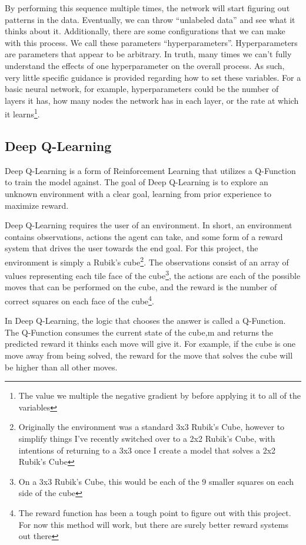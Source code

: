 \documentclass[12pt]{article}
\begin{document}
By performing this sequence multiple times, the network will start figuring out patterns in the data. Eventually, we can throw ``unlabeled data'' and see what it thinks about it. Additionally, there are some configurations that we can make with this process. We call these parameters ``hyperparameters''. Hyperparameters are parameters that appear to be arbitrary. In truth, many times we can't fully understand the effects of one hyperparameter on the overall process. As such, very little specific guidance is provided regarding how to set these variables. For a basic neural network, for example, hyperparameters could be the number of layers it has, how many nodes the network has in each layer, or the rate at which it learns\footnote{The value we multiple the negative gradient by before applying it to all of the variables}.

\subsection{Deep Q-Learning}


Deep Q-Learning is a form of Reinforcement Learning that utilizes a Q-Function to train the model against. The goal of Deep Q-Learning is to explore an unknown environment with a clear goal, learning from prior experience to maximize reward.

Deep Q-Learning requires the user of an environment. In short, an environment contains observations, actions the agent can take, and some form of a reward system that drives the user towards the end goal. For this project, the environment is simply a Rubik's cube\footnote{Originally the environment was a standard 3x3 Rubik's Cube, however to simplify things I've recently switched over to a 2x2 Rubik's Cube, with intentions of returning to a 3x3 once I create a model that solves a 2x2 Rubik's Cube}. The observations consist of an array of values representing each tile face of the cube\footnote{On a 3x3 Rubik's Cube, this would be each of the 9 smaller squares on each side of the cube}, the actions are each of the possible moves that can be performed on the cube, and the reward is the number of correct squares on each face of the cube\footnote{The reward function has been a tough point to figure out with this project. For now this method will work, but there are surely better reward systems out there}.

In Deep Q-Learning, the logic that chooses the answer is called a Q-Function. The Q-Function consumes the current state of the cube,m and returns the predicted reward it thinks each move will give it. For example, if the cube is one move away from being solved, the reward for the move that solves the cube will be higher than all other moves.
\end{document}
